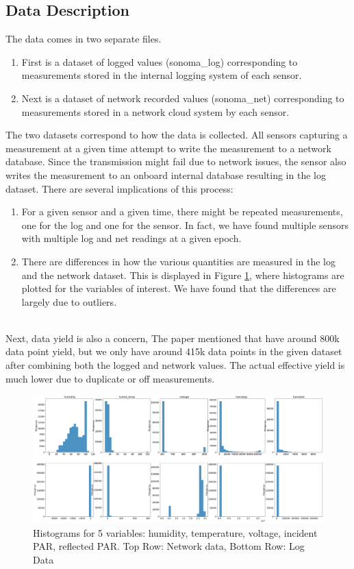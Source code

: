 \documentclass[11pt, letterpaper]{article}
\begin{document}
\subsection{Data Description}
The data comes in two separate files.
\begin{enumerate}
    \item First is a dataset of logged values (sonoma\_log) corresponding to measurements stored in the internal logging system of each sensor.
    \item Next is a dataset of network recorded values  (sonoma\_net) corresponding to measurements stored in a network cloud system by each sensor.
\end{enumerate}
The two datasets correspond to how the data is collected. All sensors capturing a measurement at a given time attempt to write the measurement to a network database. Since the transmission might fail due to network issues, the sensor also writes the measurement to an onboard internal database resulting in the log dataset. There are several implications of this process: 
\begin{enumerate}
    \item For a given sensor and a given time, there might be repeated measurements, one for the log and one for the sensor. In fact, we have found multiple sensors with multiple log and net readings at a given epoch.
    \item There are differences in how the various quantities are measured in the log and the network dataset. This is displayed in Figure \ref{fig1}, where histograms are plotted for the variables of interest. We have found that the differences are largely due to outliers.
\end{enumerate}
\\
Next, data yield is also a concern, The paper mentioned that have around 800k data point yield, but we only have around 415k data points in the given dataset after combining both the logged and network values. The actual effective yield is much lower due to duplicate or off measurements.
\\
\begin{figure}[h]
\centering
\includegraphics[width=1.0\textwidth]{Report Images/Fig1.png}
\caption{Histograms for 5 variables: humidity, temperature, voltage, incident PAR, reflected PAR. Top Row: Network data, Bottom Row: Log Data}
\label{fig1}
\end{figure}
\end{document}
